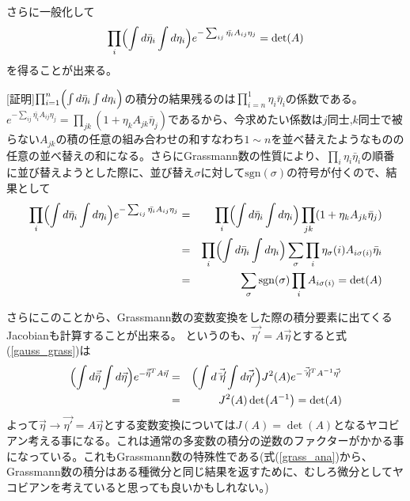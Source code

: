 \documentclass[a4paper,12pt]{jsarticle}
\begin{document}
さらに一般化して
\begin{eqnarray}
  \prod_i \Bigl(\int d\bar{\eta}_i \int d\eta_i\Bigr) e^{-\sum_{ij}\bar{\eta_i}A_{ij}\eta_j} = \det(A)
\end{eqnarray}
を得ることが出来る。

[証明]$\prod_{i=1}^n \Bigl(\int d\bar{\eta}_i \int d\eta_i\Bigr)$の積分の結果残るのは$\prod_{i=n}^1\eta_i\bar{\eta}_i$の係数である。$e^{-\sum_{ij}\bar{\eta_i}A_{ij}\eta_j} = \prod_{jk}(1 + \eta_k A_{jk}\bar{\eta}_j)$であるから、今求めたい係数は$j$同士,$k$同士で被らない$A_{jk}$の積の任意の組み合わせの和すなわち$1\sim n$を並べ替えたようなものの任意の並べ替えの和になる。さらにGrassmann数の性質により、$\prod_i\eta_i\bar{\eta}_i$の順番に並び替えようとした際に、並び替え$\sigma$に対して$\mathrm{sgn}(\sigma)$の符号が付くので、結果として
\begin{eqnarray}
  \prod_i \Bigl(\int d\bar{\eta}_i \int d\eta_i\Bigr) e^{-\sum_{ij}\bar{\eta_i}A_{ij}\eta_j} &=& \prod_i \Bigl(\int d\bar{\eta}_i \int d\eta_i\Bigr)\prod_{jk}(1 + \eta_k A_{jk}\bar{\eta}_j)\label{gauss_grass}\\
  &=& \prod_i \Bigl(\int d\bar{\eta}_i \int d\eta_i\Bigr)\sum_{\sigma} \prod_i \eta_\sigma(i) A_{i\sigma(i)} \bar{\eta}_{i}\\
  &=& \sum_{\sigma} \mathrm{sgn}(\sigma) \prod_i A_{i\sigma(i)} = \det(A)\label{grassmann_gauss}
\end{eqnarray}

さらにこのことから、Grassmann数の変数変換をした際の積分要素に出てくるJacobianも計算することが出来る。
というのも、$\vec{\eta'} = A \vec{\eta}$とすると式(\ref{gauss_grass})は
\begin{eqnarray}
  \Bigl(\int d\vec{\bar{\eta}} \int d\vec{\eta}\Bigr) e^{-\vec{\bar{\eta}}^T A \vec{\eta}} &=& \Bigl(\int d\vec{\bar{\eta}'} \int d\vec{\eta'}\Bigr) J^2(A) e^{-\vec{\bar{\eta}'}^TA^{-1} \vec{\eta'}} \\
  &=& J^2(A) \det(A^{-1}) = \det(A)\label{grassmann_jacobian}
\end{eqnarray}
よって$\vec{\eta} \rightarrow\vec{\eta'} = A \vec{\eta}$とする変数変換については$J(A) = \det(A)$となるヤコビアン考える事になる。これは通常の多変数の積分の逆数のファクターがかかる事になっている。これもGrassmann数の特殊性である(式(\ref{grass_ana})から、Grassmann数の積分はある種微分と同じ結果を返すために、むしろ微分としてヤコビアンを考えていると思っても良いかもしれない。)
\end{document}

